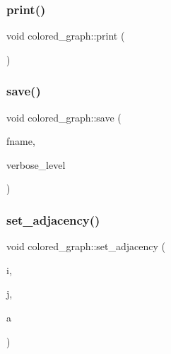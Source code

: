 \mbox{\label{classcolored__graph_a446033862cffb718270e87913e8fe843}} 
\subsubsection{\texorpdfstring{print()}{print()}}
{\footnotesize\ttfamily void colored\+\_\+graph\+::print (\begin{DoxyParamCaption}{ }\end{DoxyParamCaption})}

\mbox{\label{classcolored__graph_a562912fb7464addacd865057a1a48f75}} 
\subsubsection{\texorpdfstring{save()}{save()}}
{\footnotesize\ttfamily void colored\+\_\+graph\+::save (\begin{DoxyParamCaption}\item[{const \mbox{\hyperlink{galois_8h_ab6cc7b4aeb6ea31aba2b3fbfc83ff5e6}{B\+Y\+TE}} $\ast$}]{fname,  }\item[{\mbox{\hyperlink{galois_8h_a09fddde158a3a20bd2dcadb609de11dc}{I\+NT}}}]{verbose\+\_\+level }\end{DoxyParamCaption})}

\mbox{\label{classcolored__graph_a3c850d5d5d6bde5de472a07ff7c49687}} 
\subsubsection{\texorpdfstring{set\+\_\+adjacency()}{set\_adjacency()}}
{\footnotesize\ttfamily void colored\+\_\+graph\+::set\+\_\+adjacency (\begin{DoxyParamCaption}\item[{\mbox{\hyperlink{galois_8h_a09fddde158a3a20bd2dcadb609de11dc}{I\+NT}}}]{i,  }\item[{\mbox{\hyperlink{galois_8h_a09fddde158a3a20bd2dcadb609de11dc}{I\+NT}}}]{j,  }\item[{\mbox{\hyperlink{galois_8h_a09fddde158a3a20bd2dcadb609de11dc}{I\+NT}}}]{a }\end{DoxyParamCaption})}



